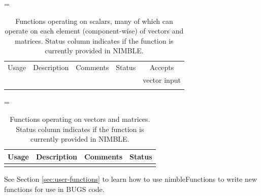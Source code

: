 \documentclass[12pt,oneside]{book}\usepackage[]{graphicx}\usepackage[]{color}
\def\cd#1{\texttt{#1}}
\begin{document}

{
\footnotesize 
\LTcapwidth=\textwidth
\begin{longtable}[c]{lllcc}
 \caption{Functions operating on scalars, many of which can operate on
   each element (component-wise) of vectors and matrices. Status
   column indicates if the function is currently provided in
   NIMBLE.}    \label{table:functions-bugs}\\
\hline
 Usage & Description & Comments & Status & Accepts \\
   &  &  &  & vector input  \\
  \hline \hline \\
\endhead

\end{longtable}
}

{
\footnotesize
\LTcapwidth=\textwidth

\begin{longtable}[c]{lllc}
 \caption{Functions operating on vectors and matrices. Status column
  indicates if the function is currently provided in
  NIMBLE.} \label{table:functions-matrix-bugs} \\
  \hline
  Usage & Description & Comments & Status   \\
  \hline \hline \\
\endhead


 \end{longtable}
}




See Section \ref{sec:user-functions} to learn how to use nimbleFunctions to write new functions for use in BUGS code.
\end{document}
